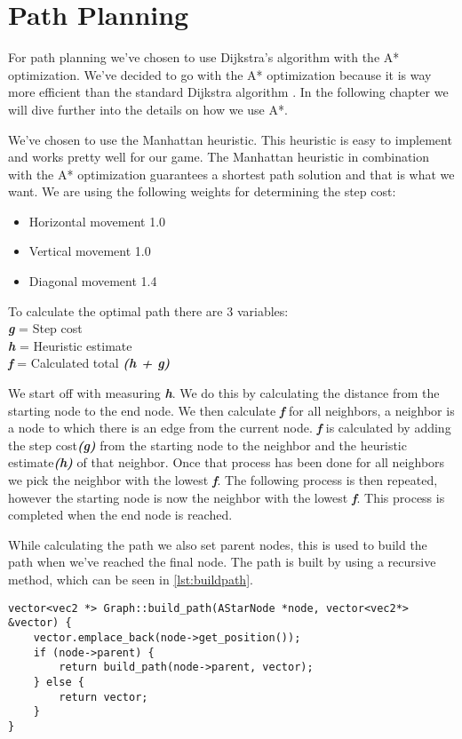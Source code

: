 \section{Path Planning} 
\label{sec:pathplanning} 
For path planning we’ve chosen to use Dijkstra's algorithm with the A* 
optimization. We've decided to go with the A* optimization because it is way 
more efficient than the standard Dijkstra algorithm \cite{rbgames}. In the 
following chapter we will dive further into the details on how we use A*.

We’ve chosen to use the Manhattan heuristic. This heuristic is easy to
implement and works pretty well for our game. The Manhattan heuristic in
combination with the A* optimization guarantees a shortest path solution
and that is what we want. We are using the following weights for determining
the step cost: 

\begin{itemize} 
    \item Horizontal movement 1.0 
    \item Vertical movement 1.0 
    \item Diagonal movement 1.4 
\end{itemize}

To calculate the optimal path there are 3 variables: 
\\ 
\textbf{\textit{g}} = Step cost \\ 
\textbf{\textit{h}} = Heuristic estimate \\ 
\textbf{\textit{f}} = Calculated total \textbf{\textit{(h + g)}}

We start off with measuring \textbf{\textit{h}}. We do this by calculating the
distance from the starting node to the end node. We then calculate
\textbf{\textit{f}} for all neighbors, a neighbor is a node to which there is
an edge from the current node. \textbf{\textit{f}} is calculated by adding the
step cost\textbf{\textit{(g)}} from the starting node to the neighbor and the
heuristic estimate\textbf{\textit{(h)}} of that neighbor. Once that process has
been done for all neighbors we pick the neighbor with the lowest
\textbf{\textit{f}}. The following process is then repeated, however the
starting node is now the neighbor with the lowest \textbf{\textit{f}}. This
process is completed when the end node is reached.

While calculating the path we also set parent nodes, this is used to build the
path when we’ve reached the final node. The path is built by using a recursive
method, which can be seen in \cref{lst:buildpath}. 

\begin{lstlisting}[caption={Build path method.},label={lst:buildpath}]
vector<vec2 *> Graph::build_path(AStarNode *node, vector<vec2*> &vector) { 
    vector.emplace_back(node->get_position()); 
    if (node->parent) { 
        return build_path(node->parent, vector); 
    } else { 
        return vector; 
    } 
} 
\end{lstlisting}
